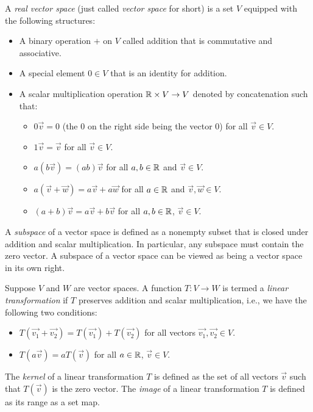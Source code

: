 \documentclass[10pt]{amsart}
\begin{document}
\begin{enumerate}
  A {\em real vector space} (just called {\em vector space} for short)
  is a set $V$ equipped with the following structures:

  \begin{itemize}
  \item A binary operation $+$ on $V$ called addition that is
    commutative and associative.
  \item A special element $0 \in V$ that is an identity for addition.
  \item A scalar multiplication operation $\mathbb{R} \times V \to V$ denoted
    by concatenation such that:
    \begin{itemize}
    \item $0\vec{v} = 0$ (the $0$ on the right side being the vector
      $0$) for all $\vec{v} \in V$.
    \item $1\vec{v} = \vec{v}$ for all $\vec{v} \in V$.
    \item $a(b\vec{v}) = (ab)\vec{v}$ for all $a,b \in \mathbb{R}$ and
      $\vec{v} \in V$.
    \item $a(\vec{v} + \vec{w}) = a\vec{v} + a\vec{w}$ for all $a \in
      \mathbb{R}$ and $\vec{v},\vec{w} \in V$.
    \item $(a + b)\vec{v} = a\vec{v} + b\vec{v}$ for all $a,b \in \mathbb{R}$,
      $\vec{v} \in V$.
    \end{itemize}
  \end{itemize}

  A {\em subspace} of a vector space is defined as a nonempty subset
  that is closed under addition and scalar multiplication. In
  particular, any subspace must contain the zero vector. A subspace of
  a vector space can be viewed as being a vector space in its own
  right.

  Suppose $V$ and $W$ are vector spaces. A function $T: V \to W$ is
  termed a {\em linear transformation} if $T$ preserves addition and
  scalar multiplication, i.e., we have the following two conditions:

  \begin{itemize}
  \item $T(\vec{v_1} + \vec{v_2}) = T(\vec{v_1}) + T(\vec{v_2})$ for
    all vectors $\vec{v_1},\vec{v_2} \in V$.
  \item $T(a\vec{v}) = aT(\vec{v})$ for all $a \in \mathbb{R}$, $\vec{v} \in
    V$.
  \end{itemize}

  The {\em kernel} of a linear transformation $T$ is defined as the
  set of all vectors $\vec{v}$ such that $T(\vec{v})$ is the zero
  vector. The {\em image} of a linear transformation $T$ is defined as
  its range as a set map.


\end{enumerate}
\end{document}
